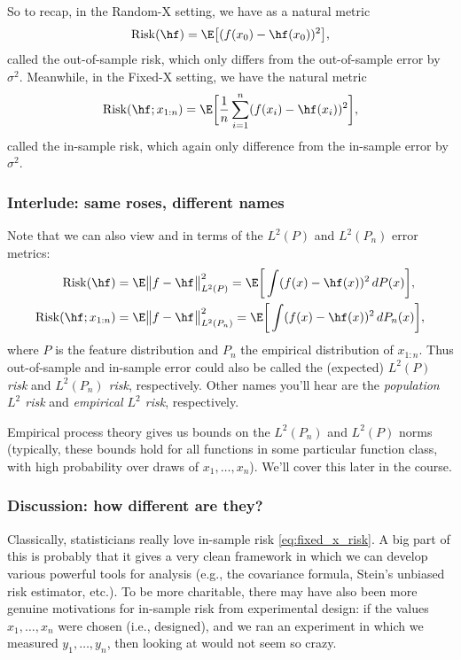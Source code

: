 \documentclass{article}
\begin{document}
So to recap, in the Random-X setting, we have as a natural metric  
\begin{equation}
\label{eq:random_x_risk}
\Risk(\hf) = \E\big[ (f(x_0) - \hf(x_0))^2 \big],
\end{equation}
called the out-of-sample risk, which only differs from the out-of-sample error
by $\sigma^2$. Meanwhile, in the Fixed-X setting, we have the natural metric 
\begin{equation}
\label{eq:fixed_x_risk}
\Risk(\hf; x_{1:n}) = \E\bigg[ \frac{1}{n}\sum_{i=1}^n (f(x_i) - \hf(x_i))^2
\bigg], 
\end{equation}
called the in-sample risk, which again only difference from the in-sample error
by $\sigma^2$.

\subsubsection{Interlude: same roses, different names}

Note that we can also view \smash{$\Risk(\hf)$} and  in terms of the $L^2(P)$ and $L^2(P_n)$ error metrics:
\begin{align*}
\Risk(\hf) &= \E \big\|f - \hf\big\|_{L^2(P)}^2 
= \E\bigg[ \int (f(x) - \hf(x))^2 \, dP(x) \bigg], \\
\Risk(\hf; x_{1:n}) &= \E \big\|f - \hf\big\|_{L^2(P_n)}^2  
= \E\bigg[ \int (f(x) - \hf(x))^2 \, dP_n(x) \bigg],
\end{align*}
where $P$ is the feature distribution and $P_n$ the empirical distribution of
$x_{1:n}$. Thus out-of-sample and in-sample error could also be called the
(expected) \emph{$L^2(P)$ risk} and \emph{$L^2(P_n)$ risk},
respectively. Other names you'll hear are the \emph{population $L^2$ risk} and
\emph{empirical $L^2$ risk}, respectively.    

Empirical process theory gives us bounds on the $L^2(P_n)$ and $L^2(P)$ norms
(typically, these bounds hold for all functions in some particular function
class, with high probability over draws of $x_1,\dots,x_n$). We'll cover this
later in the course.    

\subsubsection{Discussion: how different are they?}

Classically, statisticians really love in-sample risk \eqref{eq:fixed_x_risk}. A
big part of this is probably that it gives a very clean framework in which we
can develop various powerful tools for analysis (e.g., the covariance formula,
Stein's unbiased risk estimator, etc.). To be more charitable, there may have
also been more genuine motivations for in-sample risk from experimental design:
if the values $x_1,\dots,x_n$ were chosen (i.e., designed), and we ran an
experiment in which we measured $y_1,\dots,y_n$, then looking at
 would not seem so crazy.   
\end{document}
